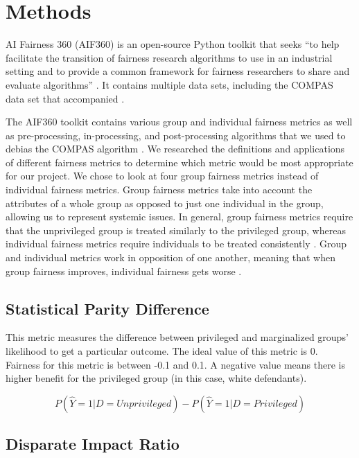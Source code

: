 \documentclass[water,article,submit,moreauthors,pdftex]{mdpi}
\begin{document}
\hypertarget{methods}{%
\section{Methods}\label{methods}}

AI Fairness 360 (AIF360) is an open-source Python toolkit that seeks
``to help facilitate the transition of fairness research algorithms to
use in an industrial setting and to provide a common framework for
fairness researchers to share and evaluate algorithms''
\citep{aif360-oct-2018}. It contains multiple data sets, including the
COMPAS data set that accompanied \citet{angwin2016machine}.

The AIF360 toolkit contains various group and individual fairness
metrics as well as pre-processing, in-processing, and post-processing
algorithms that we used to debias the COMPAS algorithm
\citep{aif360-oct-2018}. We researched the definitions and applications
of different fairness metrics \citep{ashokan2021fairness} to determine
which metric would be most appropriate for our project. We chose to look
at four group fairness metrics instead of individual fairness metrics.
Group fairness metrics take into account the attributes of a whole group
as opposed to just one individual in the group, allowing us to represent
systemic issues. In general, group fairness metrics require that the
unprivileged group is treated similarly to the privileged group, whereas
individual fairness metrics require individuals to be treated
consistently \citep{kypraiou_what_2021}. Group and individual metrics
work in opposition of one another, meaning that when group fairness
improves, individual fairness gets worse \citep{kypraiou_what_2021}.

\hypertarget{statistical-parity-difference}{%
\subsection{Statistical Parity
Difference}\label{statistical-parity-difference}}

This metric measures the difference between privileged and marginalized
groups' likelihood to get a particular outcome. The ideal value of this
metric is 0. Fairness for this metric is between -0.1 and 0.1. A
negative value means there is higher benefit for the privileged group
(in this case, white defendants).

\[P(\hat{Y}=1|D=Unprivileged) - P(\hat{Y}=1|D=Privileged)\]

\hypertarget{disparate-impact-ratio}{%
\subsection{Disparate Impact Ratio}\label{disparate-impact-ratio}}
\end{document}
